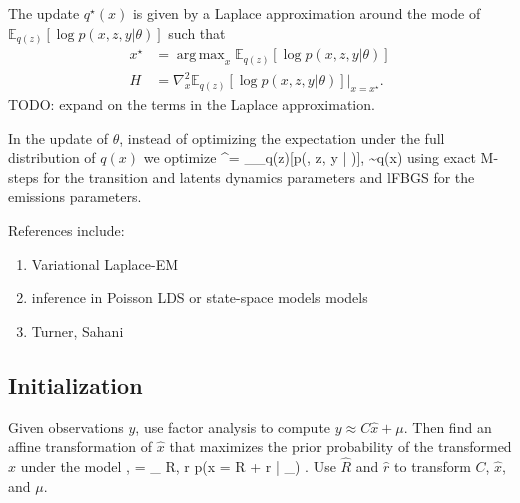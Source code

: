 \documentclass{article}
\DeclareMathOperator*{\argmax}{arg\,max}
\begin{document}
The update $q^\star(x)$ is given by a Laplace approximation around the mode of $\mathbb{E}_{q(z)}[\log p(x, z, y | \theta)]$ such that 
\begin{align*}
x^\star &= \argmax_x \mathbb{E}_{q(z)}[\log p(x, z, y | \theta)] \\
H &= \nabla_x^2 \mathbb{E}_{q(z)}[\log p(x, z, y | \theta)] \bigg|_{x = x^\star}.
\end{align*}
TODO: expand on the terms in the Laplace approximation. 

In the update of $\theta$, instead of optimizing the expectation under the full distribution of $q(x)$ we optimize
\be
\theta^\star = \argmax_\theta {}_{q(z)}[\log p(, z, y | \theta)], \quad {} \sim q(x)
\ee
using exact M-steps for the transition and latents dynamics parameters and lFBGS for the emissions parameters. 



References include: 
\begin{enumerate}
\item Variational Laplace-EM \cite{wang2013variational}
\item inference in Poisson LDS or state-space models models \cite{macke2011empirical,paninski2010new, macke2015estimating, archer2015black}
\item Turner, Sahani \cite{turner2011two}
\end{enumerate}

\subsection{Initialization}
Given observations $y$, use factor analysis to compute $y \approx C \hat{x} + \mu$. Then find an affine transformation of $\hat{x}$ that maximizes the prior probability of the transformed $\hat{x}$ under the model 
\be
{},  = \argmax_{ R, r } \log p(x = R  + r | \theta_) .
\ee
Use $\hat{R}$ and $\hat{r}$ to transform $C$, $\hat{x}$, and $\mu$.
\end{document}
